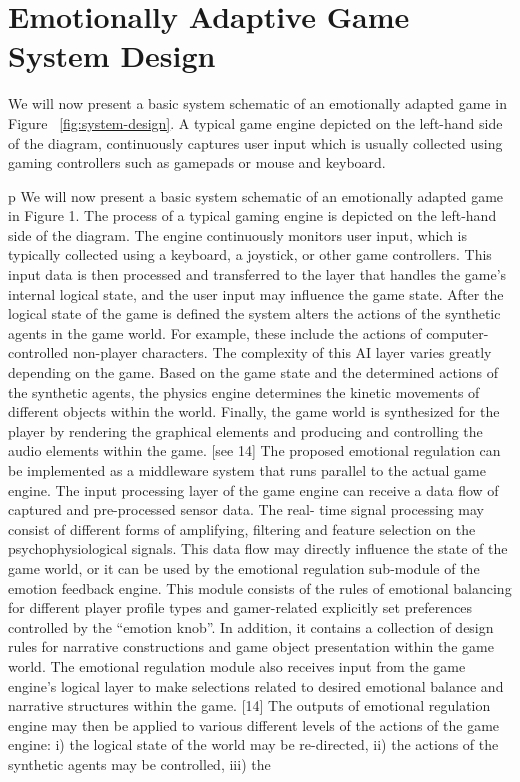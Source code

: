 \section{Emotionally Adaptive Game System Design}

We will now present a basic system schematic of an emotionally adapted game in Figure ~\ref{fig:system-design}. A typical game engine depicted on the left-hand side of the diagram, continuously captures user input which is usually collected using gaming controllers such as gamepads or mouse and keyboard.

p We will now present a basic system schematic of an emotionally adapted game in Figure 1. The process of a typical gaming engine is depicted on the left-hand side of the diagram. The engine continuously monitors user input, which is typically collected using a keyboard, a joystick, or other game controllers. This input data is then processed and transferred to the layer that handles the game's internal logical state, and the user input may influence the game state. After the logical state of the game is defined the system alters the actions of the synthetic agents in the game world. For example, these include the actions of computer-controlled non-player characters. The complexity of this AI layer varies greatly depending on the game. Based on the game state and the determined actions of the synthetic agents, the physics engine determines the kinetic movements of different objects within  the world. Finally, the game world is synthesized for the player by rendering the graphical elements and producing and controlling the audio elements within the game. [see 14] The proposed emotional regulation can be implemented as a middleware system that runs parallel to the actual game engine. The input processing layer of the game engine can receive a data flow of captured and pre-processed sensor data. The real- time signal processing may consist of different forms of amplifying, filtering and feature selection on the psychophysiological signals. This data flow may directly influence the state of the game world, or it can be used by the emotional regulation sub-module of the emotion feedback engine. This module consists of the rules of emotional balancing for different player profile types and gamer-related explicitly set preferences controlled by the “emotion knob”. In addition, it contains a collection of design rules for narrative constructions and game object presentation within the game world. The emotional regulation module also receives input from the game engine’s logical layer to make selections related to desired emotional balance and narrative structures within the game. [14] The outputs of emotional regulation engine may then be applied to various different levels of the actions of the game engine: i) the logical state of the world may be re-directed, ii) the actions of the synthetic agents may be controlled, iii) the

